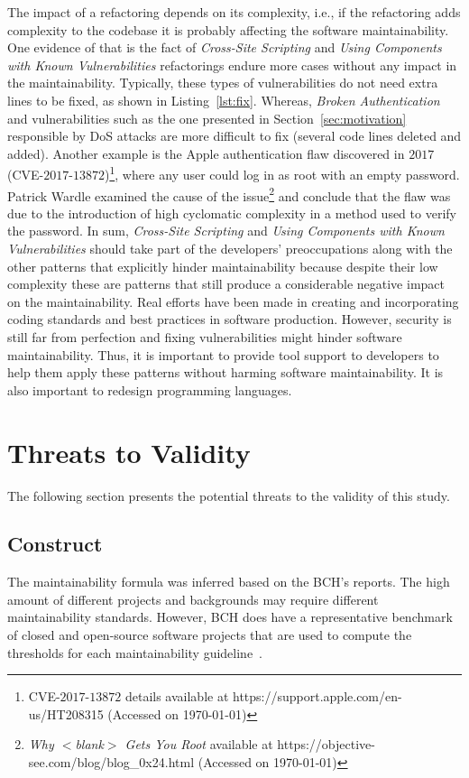 \documentclass[10pt,conference]{IEEEtran}
\newcommand\Rui[1]{\nb{Rui}{blue}{#1}}
\begin{document}
The impact of a refactoring depends on its complexity, i.e., if the refactoring
adds complexity to the codebase it is probably affecting the software
maintainability. One evidence of that is the fact of \emph{Cross-Site Scripting}
and \emph{Using Components with Known Vulnerabilities} refactorings endure more
cases without any impact in the maintainability. Typically, these types of
vulnerabilities do not need extra lines to be fixed, as shown in
Listing~\ref{lst:fix}. Whereas, \emph{Broken Authentication} and vulnerabilities
such as the one presented in Section~\ref{sec:motivation} responsible by DoS
attacks are more difficult to fix (several code lines deleted and added).
Another example is the Apple authentication flaw discovered in $2017$
(CVE-$2017$-$13872$)\footnote{CVE-$2017$-$13872$ details available at
https://support.apple.com/en-us/HT208315 (Accessed on \today{})}, where any user
could log in as root with an empty password. Patrick Wardle examined the cause
of the issue\footnote{\emph{Why $<$blank$>$ Gets You Root} available at
https://objective-see.com/blog/blog\_0x24.html (Accessed on \today{})} and
conclude that the flaw was due to the introduction of high cyclomatic complexity
in a method used to verify the password. In sum, \emph{Cross-Site Scripting} and
\emph{Using Components with Known Vulnerabilities} should take part of the
developers' preoccupations along with the other patterns that explicitly hinder
maintainability because despite their low complexity these are patterns that
still produce a considerable negative impact on the maintainability. Real
efforts have been made in creating and incorporating coding standards and best
practices in software production. However, security is still far from perfection
and fixing vulnerabilities might hinder software maintainability. Thus, it is
important to provide tool support to developers to help them apply these
patterns without harming software maintainability. It is also important to redesign programming languages. \Rui{and redesign programming
languages?}

\section{Threats to Validity}\label{sec:threats}
%
The following section presents the potential threats to the validity of this
study.
%
\subsection{Construct}
%
The maintainability formula was inferred based on the BCH's reports. The high
amount of different projects and backgrounds may require different
maintainability standards. However, BCH does have a representative benchmark of
closed and open-source software projects that are used to compute the
thresholds for each maintainability guideline~\cite{Visser:2016:OREILLY, Baggen2012}.
\end{document}
